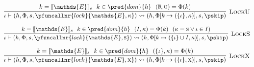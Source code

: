 \[
\infer[\textsc{LockU}]
{
	\iota \vdash (h, \Phi, s, \pfuncallnr{lock}{\mathds{E}, \kappa})
	\rightsquigarrow
	(h, \Phi[k \mapsto (\{\iota\}, \kappa)], s, \pskip)
}
{
	k = \llbracket \mathds{E} \rrbracket_s\ \
	k \in \pred{dom}{h}\ \
	(\emptyset, \textsc{u}) = \Phi(k)
}
\]

\[
\infer[\textsc{LockS}]
{
	\iota \vdash (h, \Phi, s, \pfuncallnr{lock}{\mathds{E}, \textsc{s}})
	\rightsquigarrow
	(h, \Phi[k \mapsto (\{\iota\} \cup I, \kappa)], s, \pskip)
}
{
	k = \llbracket \mathds{E} \rrbracket_s\ \
	k \in \pred{dom}{h}\ \
	(I, \kappa) = \Phi(k)\ \
	(\kappa = \textsc{s} \lor \iota \in I)
}
\]

\[
\infer[\textsc{LockX}]
{
	\iota \vdash (h, \Phi, s, \pfuncallnr{lock}{\mathds{E}, \textsc{x}})
	\rightsquigarrow
	(h, \Phi[k \mapsto (\{\iota\}, \textsc{x})], s, \pskip)
}
{
	k = \llbracket \mathds{E} \rrbracket_s\ \
	k \in \pred{dom}{h}\ \
	(\{\iota\}, \kappa) = \Phi(k)
}
\]